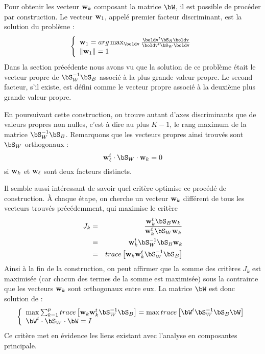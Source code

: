 Pour obtenir les vecteur $\mbox{\bf w}_k$ composant la matrice $\bW$, il est possible
de proc\'eder par construction. Le vecteur $\mbox{\bf w}_1$, appel\'e premier facteur
discriminant, est la solution du probl\`eme :
$$
\left \{ \begin{array}{l}
\bw_1 = arg \max_{\boldv} \frac{\boldv^t \bS_B  \boldv}{\boldv^t \bS_W \boldv}  \\
\| \bw_1 \|=1    \\
\end{array}
\right.
$$ 
Dans la section pr\'ec\'edente nous avons vu que la solution de ce probl\`eme
\'etait le vecteur propre de $\bS_W^{-1}\bS_B$ associ\'e \`a la plus
grande valeur propre. Le second facteur, s'il existe, est d\'efini comme le 
vecteur propre associ\'e \`a la deuxi\`eme plus grande valeur propre.

En poursuivant cette construction, on trouve autant d'axes discriminants
que de valeurs propres non nulles,  c'est \`a dire au plus $K-1$, le
rang maximum de la matrice $\bS_W^{-1}\bS_B$. Remarquons que les vecteurs
propres ainsi trouv\'es sont $\bS_W$ orthogonaux :
$$
\bw_\ell^t \cdot \bS_W \cdot \bw_k = 0
$$
si $\mbox{\bf w}_k$ et $\mbox{\bf w}_\ell$ sont deux facteurs distincts.

Il semble aussi int\'eressant de savoir quel crit\`ere
optimise ce proc\'ed\'e de construction. \`A chaque \'etape,
on cherche un vecteur $\mbox{\bf w}_k$ diff\'erent de tous  les vecteurs trouv\'es
pr\'ec\'edemment, qui maximise le crit\`ere 
\begin{eqnarray*}
J_k & = & \frac{\bw_k^t \bS_B  \bw_k}{\bw_k^t \bS_W \bw_k} \\
    & = & \bw_k^t  \bS_W^{-1}\bS_B \bw_k \\
    & = & trace \left [ \bw_k  \bw_k^t  \bS_W^{-1}\bS_B  \right ]
\end{eqnarray*} 
Ainsi \`a la fin de la construction, on peut affirmer que la
somme des crit\`eres $J_k$ est maximis\'ee (car chacun des termes de
la somme est maximis\'ee)  sous la contrainte
que les vecteurs $\mbox{\bf w}_k$ sont orthogonaux entre eux. La matrice
$\bW$ est donc solution de :
$$
\left \{ \begin{array}{l}
\max \sum_{k=1}^p  trace \left [ \bw_k  \bw_k^t  \bS_W^{-1}\bS_B  \right ] = \max trace \left [ \bW^t \bS_W^{-1}\bS_B \bW \right ]         \\
\bW^t \cdot \bS_W \cdot \bW=I
\end{array}
\right.
$$
Ce crit\`ere met en \'evidence les liens existant avec l'analyse en composantes
principale.

